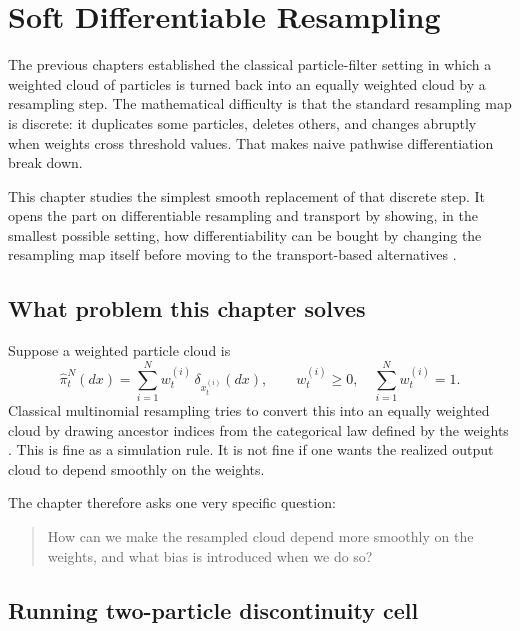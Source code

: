 \chapter{Soft Differentiable Resampling}
\label{ch:bf-dpf-soft-resampling}

The previous chapters established the classical particle-filter setting in which a
weighted cloud of particles is turned back into an equally weighted cloud by a
resampling step.  The mathematical difficulty is that the standard resampling map
is discrete: it duplicates some particles, deletes others, and changes abruptly
when weights cross threshold values.  That makes naive pathwise differentiation
break down.

This chapter studies the simplest smooth replacement of that discrete step.  It
opens the part on differentiable resampling and transport by showing, in the
smallest possible setting, how differentiability can be bought by changing the
resampling map itself before moving to the transport-based alternatives
\citep{zhumurphyjonschkowski2020,jonschkowski2018differentiable,corenflos2021differentiable}.

\section{What problem this chapter solves}
\label{sec:bf-soft-what-problem}

Suppose a weighted particle cloud is
\begin{equation}
\label{eq:bf-soft-weighted-cloud}
  \hat\pi_t^N(dx)
  =
  \sum_{i=1}^N w_t^{(i)}\,\delta_{x_t^{(i)}}(dx),
  \qquad
  w_t^{(i)}\ge 0,
  \quad
  \sum_{i=1}^N w_t^{(i)}=1.
\end{equation}
Classical multinomial resampling tries to convert this into an equally weighted
cloud by drawing ancestor indices from the categorical law defined by the weights
\citep{doucet2001sequential,chopin2020introduction}.
This is fine as a simulation rule.  It is not fine if one wants the realized
output cloud to depend smoothly on the weights.

The chapter therefore asks one very specific question:
\begin{quote}
How can we make the resampled cloud depend more smoothly on the weights, and what
bias is introduced when we do so?
\end{quote}

\section{Running two-particle discontinuity cell}
\label{sec:bf-soft-two-particle-cell}

